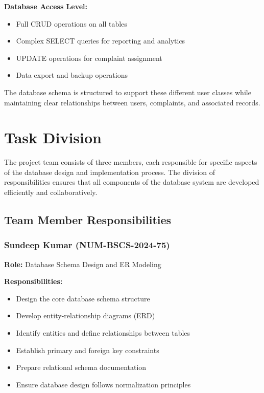 \documentclass[12pt,a4paper]{article}
\begin{document}
\textbf{Database Access Level:}
\begin{itemize}
    \item Full CRUD operations on all tables
    \item Complex SELECT queries for reporting and analytics
    \item UPDATE operations for complaint assignment
    \item Data export and backup operations
\end{itemize}

The database schema is structured to support these different user classes while maintaining clear relationships between users, complaints, and associated records.

\section{Task Division}

The project team consists of three members, each responsible for specific aspects of the database design and implementation process. The division of responsibilities ensures that all components of the database system are developed efficiently and collaboratively.

\subsection{Team Member Responsibilities}

\subsubsection{Sundeep Kumar (NUM-BSCS-2024-75)}
\textbf{Role:} Database Schema Design and ER Modeling

\textbf{Responsibilities:}
\begin{itemize}
    \item Design the core database schema structure
    \item Develop entity-relationship diagrams (ERD)
    \item Identify entities and define relationships between tables
    \item Establish primary and foreign key constraints
    \item Prepare relational schema documentation
    \item Ensure database design follows normalization principles
\end{itemize}
\end{document}
